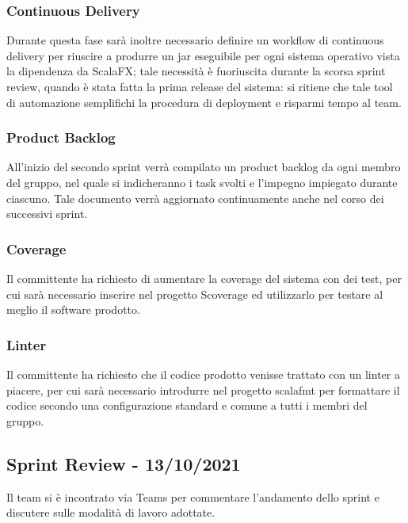 \subsubsection{Continuous Delivery}
Durante questa fase sarà inoltre necessario definire un workflow di continuous delivery per riuscire a produrre un
jar eseguibile per ogni sistema operativo vista la dipendenza da ScalaFX; tale necessità è fuoriuscita durante la
scorsa sprint review, quando è stata fatta la prima release del sistema: si ritiene che tale tool di automazione
semplifichi la procedura di deployment e risparmi tempo al team.

\subsubsection{Product Backlog}
All'inizio del secondo sprint verrà compilato un product backlog da ogni membro del gruppo, nel quale si indicheranno
i task svolti e l'impegno impiegato durante ciascuno. Tale documento verrà aggiornato continuamente anche nel corso
dei successivi sprint.

\subsubsection{Coverage}
Il committente ha richiesto di aumentare la coverage del sistema con dei test, per cui sarà necessario
inserire nel progetto Scoverage ed utilizzarlo per testare al meglio il software prodotto.

\subsubsection{Linter}
Il committente ha richiesto che il codice prodotto venisse trattato con un linter a piacere, per cui sarà necessario
introdurre nel progetto scalafmt per formattare il codice secondo una configurazione standard e comune a tutti i membri
del gruppo.

\subsection{Sprint Review - 13/10/2021}
Il team si è incontrato via Teams per commentare l'andamento dello sprint e discutere sulle modalità di lavoro adottate.

